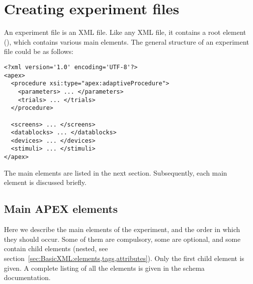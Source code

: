 \chapter{Creating experiment files}
\label{chap:Creating experiment files}

An \apex experiment file is an XML file. Like any XML file, it
contains a root element (), which contains various
main elements. The general structure of an \apex experiment file
could be as follows:

\begin{lstlisting}
<?xml version='1.0' encoding='UTF-8'?>
<apex>
  <procedure xsi:type="apex:adaptiveProcedure">
    <parameters> ... </parameters>
    <trials> ... </trials>
  </procedure>

  <screens> ... </screens>
  <datablocks> ... </datablocks>
  <devices> ... </devices>
  <stimuli> ... </stimuli>
</apex>
\end{lstlisting}

The main elements are listed in the next section. Subsequently,
each main element is discussed briefly.

\section{Main APEX elements}

Here we describe the main elements of the experiment, and the
order in which they should occur. Some of them are compulsory,
some are optional, and some contain child elements (nested, see
section~\ref{sec:BasicXML:elements,tags,attributes}). Only the
first child element is given. A complete listing of all the
elements is given in the schema documentation.


